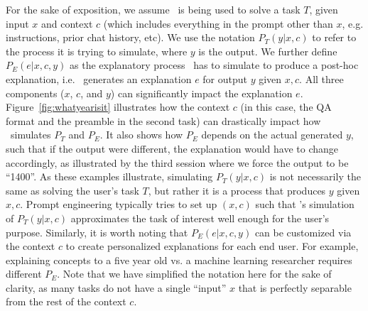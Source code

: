 
For the sake of exposition, we assume \DV\ is being used to solve a task $T$, given input $x$ and context $c$ (which includes everything in the prompt other than $x$, e.g. instructions, prior chat history, etc).
We use the notation $P_T(y | x, c)$ to refer to the process it is trying to simulate, where $y$ is the output.
We further define $P_E(e | x, c, y)$ as the explanatory process \DV\ has to simulate to produce a post-hoc explanation,  i.e. \DV\ generates an explanation $e$ for output $y$ given $x, c$. 
All three components ($x$, $c$, and $y$) can significantly impact the explanation $e$. Figure~\ref{fig:whatyearisit} illustrates how the context $c$ (in this case, the QA format and the preamble in the second task) can drastically impact how \DV\ simulates $P_T$ and $P_E$.
It also shows how $P_E$ depends on the actual generated $y$, such that if the output were different, the explanation would have to change accordingly, as illustrated by the third session where we force the output to be ``1400''.
As these examples illustrate, simulating $P_T(y | x, c)$ is not necessarily the same as solving the user's task $T$, but rather it is a process that produces $y$ given $x, c$. Prompt engineering typically tries to set up $(x, c)$ such that {\DV}'s simulation of $P_T(y | x, c)$ approximates the task of interest well enough for the user's purpose. 
Similarly, it is worth noting that $P_E(e | x, c, y)$ can be customized via the context $c$ to create personalized explanations for each end user. For example, explaining concepts to a five year old vs. a machine learning researcher requires different $P_E$.
Note that we have simplified the notation here for the sake of clarity, as many tasks do not have a single ``input'' $x$ that is perfectly separable from the rest of the context $c$.


